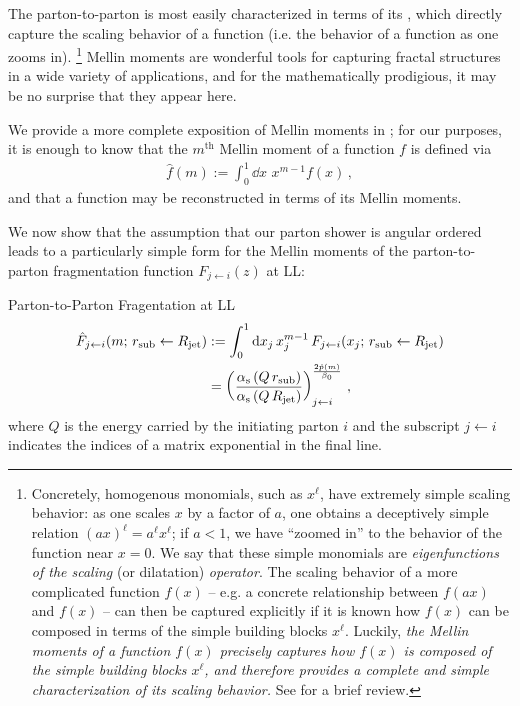 The \gls{parton-to-parton} is most easily characterized in terms of its , which directly capture the scaling behavior of a function (i.e. the behavior of a function as one zooms in).%
\footnote{
    Concretely, homogenous monomials, such as \(x^\ell\), have extremely simple scaling behavior:
    as one scales \(x\) by a factor of \(a\), one obtains a deceptively simple relation \((a x)^\ell = a^\ell x^\ell\);
    if \(a < 1\), we have ``zoomed in'' to the behavior of the function near \(x = 0\).
    We say that these simple monomials are \textit{eigenfunctions of the scaling} (or dilatation) \textit{operator}.
    The scaling behavior of a more complicated function \(f(x)\) -- e.g. a concrete relationship between \(f(ax)\) and \(f(x)\) -- can then be captured explicitly if it is known how \(f(x)\) can be composed in terms of the simple building blocks \(x^\ell\).
    Luckily, \textit{the Mellin moments of a function \(f(x)\) precisely captures how \(f(x)\) is composed of the simple building blocks \(x^\ell\), and therefore provides a complete and simple characterization of its scaling behavior.}
    See  for a brief review.
}
%
Mellin moments are wonderful tools for capturing fractal structures in a wide variety of applications, and for the mathematically prodigious, it may be no surprise that they appear here.


We provide a more complete exposition of Mellin moments in ;
%
for our purposes, it is enough to know that the \(m^\text{th}\) Mellin moment of a function \(f\) is defined via
\begin{align}
    \hat{f}(m) := \int_0^1 \dd x \,\, x^{m-1} f(x)
    \,,
\end{align}
and that a function may be reconstructed in terms of its Mellin moments.

We now show that the assumption that our parton shower is angular ordered leads to a particularly simple form for the Mellin moments of the parton-to-parton fragmentation function \(F_{j \leftarrow i}(z)\) at LL:

\begin{proposition}{Parton-to-Parton Fragentation at LL}{}
\begin{align}
    \label{eq:mellin_transform_defn}
    \hat{F}_{j \leftarrow i}(m;\,\rsub \leftarrow \Rjet)
    &:=
    \int_0^1 \dd x_j \, x_j^{m-1}
    \,
    F_{j \leftarrow i}(x_j;\,\rsub \leftarrow \Rjet)
    \\
    \label{eq:ll_fragmentation_function}
    &=
    \le(\frac{\alphas\le(Q\,\rsub\ri)}{\alphas\le(Q\,\Rjet\ri)}\ri)
    ^
    {\frac{2 \hat{p}(m)}{\beta_0}}
    _{j\leftarrow i}
    \,,
\end{align}
where \(Q\) is the energy carried by the initiating parton \(i\) and the subscript \(j \leftarrow i\) indicates the indices of a matrix exponential in the final line.
\end{proposition}



